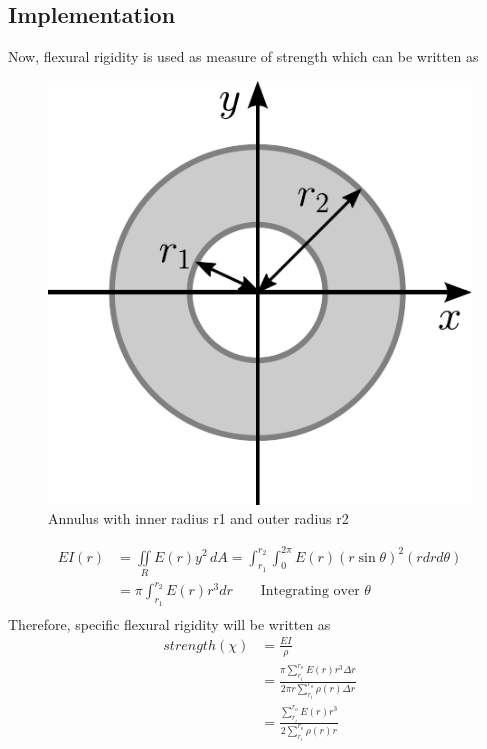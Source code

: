 \documentclass[10pt]{article}
\begin{document}
\subsection{Implementation}
Now, flexural rigidity is used as measure of strength which can be written as 
\begin{figure}
\begin{center}
\includegraphics[scale=0.3]{moment_annulus}
\caption{Annulus with inner radius r1 and outer radius r2}
\end{center}
\end{figure}
\begin{equation}
\begin{split}
EI(r) &= \underset{R}{\iint}E(r)y^2\,dA = \int_{r_1}^{r_2}\int_0^{2\pi} E(r)(r\sin\theta)^2(rdrd\theta)\\
&= \pi\int_{r_1}^{r_2} E(r)r^3 dr \qquad \text{Integrating over $\theta$}\\
\end{split}
\end{equation}
Therefore, specific flexural rigidity will be written as
\begin{equation}\label{objective_eb}
\begin{split}
strength(\chi) &=\frac{EI}{\rho}\\
&=\frac{\pi\sum^{r_o}_{r_i}E(r)r^3\Delta r}{2\pi r\sum^{r_o}_{r_i}\rho(r)\Delta r}\\
&=\frac{\sum^{r_o}_{r_i}E(r)r^3}{2 \sum^{r_o}_{r_i}\rho(r)r}
\end{split}
\end{equation}
\end{document}
